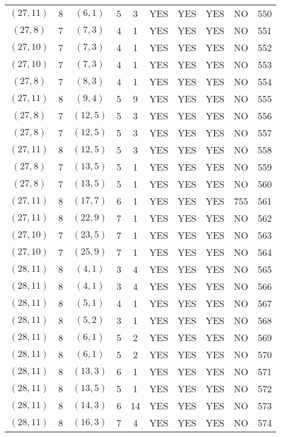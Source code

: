 \begin{longtable}{|c|c|c|c|c|c|c|c|c|c|}
$(27, 11)$ & 8 & $(6, 1)$ & 5 & 3 & YES & YES & YES & NO & 550\\
$(27, 8)$ & 7 & $(7, 3)$ & 4 & 1 & YES & YES & YES & NO & 551\\
$(27, 10)$ & 7 & $(7, 3)$ & 4 & 1 & YES & YES & YES & NO & 552\\
$(27, 10)$ & 7 & $(7, 3)$ & 4 & 1 & YES & YES & YES & NO & 553\\
$(27, 8)$ & 7 & $(8, 3)$ & 4 & 1 & YES & YES & YES & NO & 554\\
$(27, 11)$ & 8 & $(9, 4)$ & 5 & 9 & YES & YES & YES & NO & 555\\
$(27, 8)$ & 7 & $(12, 5)$ & 5 & 3 & YES & YES & YES & NO & 556\\
$(27, 8)$ & 7 & $(12, 5)$ & 5 & 3 & YES & YES & YES & NO & 557\\
$(27, 11)$ & 8 & $(12, 5)$ & 5 & 3 & YES & YES & YES & NO & 558\\
$(27, 8)$ & 7 & $(13, 5)$ & 5 & 1 & YES & YES & YES & NO & 559\\
$(27, 8)$ & 7 & $(13, 5)$ & 5 & 1 & YES & YES & YES & NO & 560\\
$(27, 11)$ & 8 & $(17, 7)$ & 6 & 1 & YES & YES & YES & 755 & 561\\
$(27, 11)$ & 8 & $(22, 9)$ & 7 & 1 & YES & YES & YES & NO & 562\\
$(27, 10)$ & 7 & $(23, 5)$ & 7 & 1 & YES & YES & YES & NO & 563\\
$(27, 10)$ & 7 & $(25, 9)$ & 7 & 1 & YES & YES & YES & NO & 564\\
$(28, 11)$ & 8 & $(4, 1)$ & 3 & 4 & YES & YES & YES & NO & 565\\
$(28, 11)$ & 8 & $(4, 1)$ & 3 & 4 & YES & YES & YES & NO & 566\\
$(28, 11)$ & 8 & $(5, 1)$ & 4 & 1 & YES & YES & YES & NO & 567\\
$(28, 11)$ & 8 & $(5, 2)$ & 3 & 1 & YES & YES & YES & NO & 568\\
$(28, 11)$ & 8 & $(6, 1)$ & 5 & 2 & YES & YES & YES & NO & 569\\
$(28, 11)$ & 8 & $(6, 1)$ & 5 & 2 & YES & YES & YES & NO & 570\\
$(28, 11)$ & 8 & $(13, 3)$ & 6 & 1 & YES & YES & YES & NO & 571\\
$(28, 11)$ & 8 & $(13, 5)$ & 5 & 1 & YES & YES & YES & NO & 572\\
$(28, 11)$ & 8 & $(14, 3)$ & 6 & 14 & YES & YES & YES & NO & 573\\
$(28, 11)$ & 8 & $(16, 3)$ & 7 & 4 & YES & YES & YES & NO & 574\\

\end{longtable}
